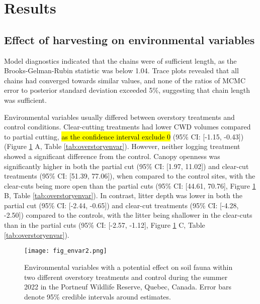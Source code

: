 \clearpage


\section*{Results}
\label{sec:results1}

\subsection*{Effect of harvesting on environmental variables}
\label{subsec:ResEnv}

Model diagnostics indicated that the chains were of sufficient length, as the Brooks-Gelman-Rubin statistic was below 1.04. 
Trace plots revealed that all chains had converged towards similar values, and none of the ratios of MCMC error to posterior standard deviation exceeded 5\%, suggesting that chain length was sufficient.

Environmental variables usually differed between overstory treatments and control conditions. 
Clear-cutting treatments had lower CWD volumes compared to partial cutting, \hl{as the confidence interval exclude 0} (95\% CI: [-1.15, -0.43]) (Figure \ref{fig:envar} A, Table \ref{tab:overstoryenvar}). 
However, neither logging treatment showed a significant difference from the control. 
Canopy openness was significantly higher in both the partial cut (95\% CI: [1.97, 11.02]) and clear-cut treatments (95\% CI: [51.39, 77.06]), when compared 
to the control sites, with the clear-cuts being more open than the partial cuts (95\% CI: [44.61, 70.76], Figure \ref{fig:envar} B, Table \ref{tab:overstoryenvar}). 
In contrast, litter depth was lower in both the partial cut (95\% CI: [-2.44, -0.65]) and clear-cut treatments (95\% CI: [-4.28, -2.50]) compared to the controls, 
with the litter being shallower in the clear-cuts than in the partial cuts (95\% CI: [-2.57, -1.12], Figure \ref{fig:envar} C, Table \ref{tab:overstoryenvar}).


\vspace{10pt}

\begin{figure}[ht]
  \centering
  \texttt{[image: fig\_envar2.png]}
  \caption[Environmental variables with a potential effect on soil fauna within two different overstory treatments and control.]
  {Environmental variables with a potential effect on soil fauna within two different overstory treatments and control 
  during the summer 2022 in the Portneuf Wildlife Reserve, Quebec, Canada. Error bars denote 95\% credible intervals around estimates.}
  \label{fig:envar}
\end{figure}

